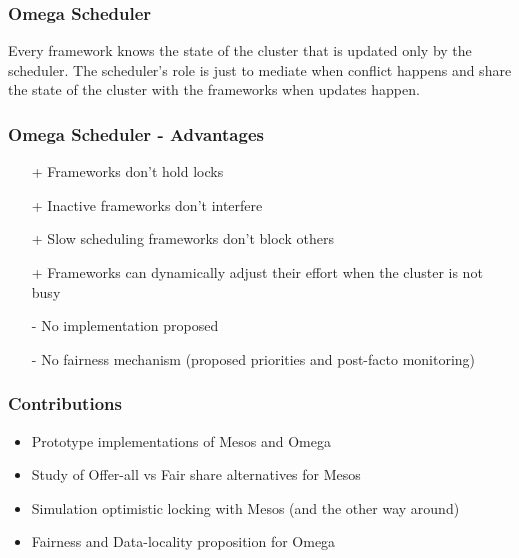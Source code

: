 \documentclass[notes]{beamer}
\begin{document}
  \note{}

  \begin{frame}
    \frametitle{Omega Scheduler}
    \begin{definition}
      Every framework knows the state of the cluster that
      is updated only by the scheduler. The scheduler's role
      is just to mediate when conflict happens and share
      the state of the cluster with the frameworks when updates
      happen.
    \end{definition}
  \end{frame}

  \note{}


  \begin{frame}
    \frametitle{Omega Scheduler - Advantages}
    \begin{itemize}
      \item[+] Frameworks don't hold locks
      \item[+] Inactive frameworks don't interfere
      \item[+] Slow scheduling frameworks don't block others
      \item[+] Frameworks can dynamically adjust their effort when 
            the cluster is not busy
      \item[-] No implementation proposed
      \item[-] No fairness mechanism (proposed priorities and post-facto monitoring)
    \end{itemize}
  \end{frame}

  \note{}

  \begin{frame}
    \frametitle{Contributions}
    \begin{itemize}
        \item Prototype implementations of Mesos and Omega
        \item Study of Offer-all vs Fair share alternatives for Mesos
        \item Simulation optimistic locking with Mesos (and the other way around)
        \item Fairness and Data-locality proposition for Omega
    \end{itemize}
  \end{frame}

  \note{}
\end{document}
